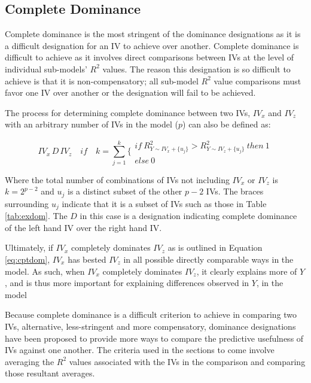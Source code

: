 \documentclass[ShortAfour,times,sageapa]{sagej}
\begin{document}
	\subsection{Complete Dominance}
	
	Complete dominance is the most stringent of the dominance designations as it is a difficult designation for an IV to achieve over another.
	Complete dominance is difficult to achieve as it involves direct comparisons between IVs at the level of individual sub-models' $R^2$ values.
	The reason this designation is so difficult to achieve is that it is non-compensatory; all sub-model $R^2$ value comparisons must favor one IV over another or the designation will fail to be achieved.
	
	The process for determining complete dominance between two IVs, $IV_x$ and $IV_z$ with an arbitrary number of IVs in the model ($p$) can also be defined as:
	
	\begin{equation}
		IV_x \, D \, IV_z \quad if \quad k = \sum^k_{j=1} \Biggr\{ \begin{matrix} if \ R^2_{Y \sim IV_x + \{u_j\}} > R^2_{Y \sim IV_z + \{u_j\}} \ then \ 1 \\ else \ 0 \end{matrix}
		\label{eq:cptdom}
	\end{equation}
	
	Where the total number of combinations of IVs not including $IV_x$ or $IV_z$ is $k = 2^{p - 2}$ and $u_j$ is a distinct subset of the other $p - 2$ IVs.
	The braces surrounding $u_j$ indicate that it is a subset of IVs such as those in Table \ref{tab:exdom}.
	The $D$ in this case is a designation indicating complete dominance of the left hand IV over the right hand IV.
	
	Ultimately, if $IV_x$ completely dominates $IV_z$ as is outlined in Equation \ref{eq:cptdom}, $IV_x$ has bested $IV_z$ 
	in all possible directly comparable ways in the model.
	As such, when $IV_x$ completely dominates $IV_z$, it clearly explains more of $Y$, and is thus more important for explaining differences observed in $Y$, in the model
	
	Because complete dominance is a difficult criterion to achieve in comparing two IVs, alternative, less-stringent and more compensatory, dominance designations have been proposed to provide more ways to compare the predictive usefulness of IVs against one another.
	The criteria used in the sections to come involve averaging the $R^2$ values associated with the IVs in the comparison and comparing those resultant averages.
	
\end{document}
